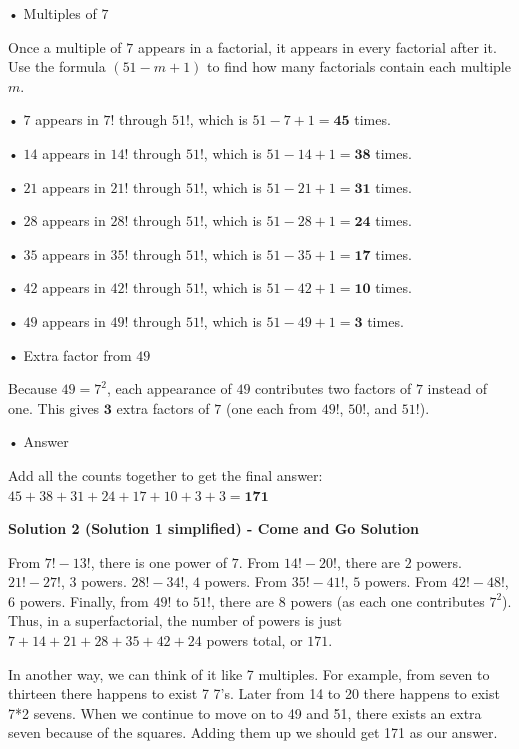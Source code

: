 \begin{enumerate}
 • Multiples of \(7\)

 Once a multiple of \(7\) appears in a factorial, it appears in every factorial after it. Use the formula \((51 - m + 1)\) to find how many factorials contain each multiple \(m\).

 	• \(7\) appears in \(7!\) through \(51!\), which is \(51 - 7 + 1 = \mathbf{45}\) times.

 	• \(14\) appears in \(14!\) through \(51!\), which is \(51 - 14 + 1 = \mathbf{38}\) times.

 	• \(21\) appears in \(21!\) through \(51!\), which is \(51 - 21 + 1 = \mathbf{31}\) times.

 	• \(28\) appears in \(28!\) through \(51!\), which is \(51 - 28 + 1 = \mathbf{24}\) times.

 	• \(35\) appears in \(35!\) through \(51!\), which is \(51 - 35 + 1 = \mathbf{17}\) times.

 	• \(42\) appears in \(42!\) through \(51!\), which is \(51 - 42 + 1 = \mathbf{10}\) times.

 	• \(49\) appears in \(49!\) through \(51!\), which is \(51 - 49 + 1 = \mathbf{3}\) times.

 • Extra factor from \(49\)

 Because \(49 = 7^2\), each appearance of \(49\) contributes two factors of \(7\) instead of one. This gives \(\mathbf{3}\) extra factors of \(7\) (one each from \(49!\), \(50!\), and \(51!\)).

 • Answer

 Add all the counts together to get the final answer:\(45+38+31+24+17+10+3+3=\mathbf{171}\)

 



\textbf{Solution 2 (Solution 1 simplified) - Come and Go Solution}

From $7! - 13!$, there is one power of $7$. From $14! - 20!$, there are $2$ powers. $21! - 27!$, $3$ powers. $28! - 34!$, $4$ powers. From $35! - 41!$, $5$ powers. From $42! - 48!$, $6$ powers. Finally, from $49!$ to $51!$, there are $8$ powers (as each one contributes $7^2$). Thus, in a superfactorial, the number of powers is just $7+14+21+28+35+42+24$ powers total, or $\boxed{171}$.

 In another way, we can think of it like 7 multiples. For example, from seven to thirteen there happens to exist 7 7's. Later from 14 to 20 there happens to exist 7*2 sevens. When we continue to move on to 49 and 51, there exists an extra seven because of the squares. Adding them up we should get 171 as our answer.


\end{enumerate}
